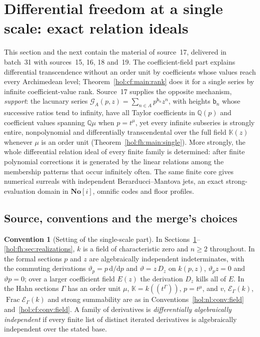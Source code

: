 \documentclass[11pt]{article}
\numberwithin{equation}{section}
\theoremstyle{definition}
\newtheorem{convention}[theorem]{Convention}
\theoremstyle{remark}
\newcommand{\Q}{\mathbb Q}
\newcommand{\No}{\mathbf{No}}
\newcommand{\KK}{\mathbb K}
\newcommand{\EK}{\mathcal E_\Gamma(k)}
\newcommand{\FE}{\operatorname{Frac}\EK}
\begin{document}
\section{Differential freedom at a single scale: exact relation ideals}
\label{hol:fh:sec:setting}

This section and the next contain the material of source~17, delivered in
batch~31 with sources~15, 16, 18 and~19. The coefficient-field part explains
differential transcendence without an order unit by coefficients whose values
reach every Archimedean level; Theorem~\ref{hol:cf:main:rank} does it for a
single series by infinite coefficient-value rank. Source~17 supplies the
opposite mechanism, \emph{support}: the lacunary series
$\mathcal G_A(p,z)=\sum_{n\in A}p^{\mathsf b_n}z^n$, with heights
$\mathsf b_n$ whose successive ratios tend to infinity, have all Taylor
coefficients in $\Q(p)$ and coefficient values spanning $\Q\mu$ when
$p=t^\mu$, yet every infinite subseries is strongly entire, nonpolynomial and
differentially transcendental over the full field $\KK(z)$ whenever $\mu$ is an
order unit (Theorem~\ref{hol:fh:main:single}). More strongly, the whole
differential relation ideal of every finite family is determined: after
finite polynomial corrections it is generated by the linear relations among
the membership patterns that occur infinitely often. The same finite core
gives numerical surreals with independent Berarducci--Mantova jets, an exact
strong-evaluation domain in $\No[i]$, omnific codes and floor profiles.

\subsection{Source, conventions and the merge's choices}
\label{hol:fh:sub:conventions}

\begin{convention}[Setting of the single-scale part]
\label{hol:fh:conv:field}
In Sections~\ref{hol:fh:sec:setting}--\ref{hol:fh:sec:realizations}, $k$ is a
field of characteristic zero and $n\ge2$ throughout. In the formal sections
$p$ and $z$ are algebraically independent indeterminates, with the commuting
derivations $\vartheta_p=p\,\mathrm d/\mathrm dp$ and $\vartheta=z\,D_z$ on
$k(p,z)$, $\vartheta_pz=0$ and $\vartheta p=0$; over a larger coefficient field
$E(z)$ the derivation $D_z$ kills all of $E$. In the Hahn sections $\Gamma$ has
an order unit $\mu$, $\KK=k((t^\Gamma))$, $p=t^\mu$, and $v$, $\EK$, $\FE$ and
strong summability are as in Conventions~\ref{hol:nl:conv:field}
and~\ref{hol:cf:conv:field}. A family of derivatives is \emph{differentially
algebraically independent} if every finite list of distinct iterated
derivatives is algebraically independent over the stated base.
\end{convention}
\end{document}
